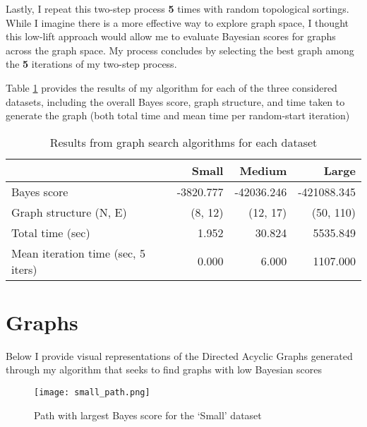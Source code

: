 \documentclass[twoside,11pt]{article}
\begin{document}
Lastly, I repeat this two-step process \textbf{5} times with random topological sortings. While I imagine there is a more effective way to explore graph space, I thought this low-lift approach would allow me to evaluate Bayesian scores for graphs across the graph space. My process concludes by selecting the best graph among the \textbf{5} iterations of my two-step process.

Table \ref{tab:results} provides the results of my algorithm for each of the three considered datasets, including the overall Bayes score, graph structure, and time taken to generate the graph (both total time and mean time per random-start iteration)

\begin{table}
    \begin{center}
    \begin{tabular}{lrrr}
         {} & \textbf{Small} & \textbf{Medium} & \textbf{Large}\\
         \midrule
        Bayes score                           & -3820.777   & -42036.246 & -421088.345  \\
        Graph structure (N, E)                &   (8, 12)   &   (12, 17) &   (50, 110)  \\
        Total time (sec)                      &     1.952   &    30.824  &    5535.849  \\
        Mean iteration time (sec, 5 iters)   &      0.000   &     6.000  &    1107.000  \\
        \bottomrule
    \end{tabular}
    \end{center}
    \caption{\label{tab:results} Results from graph search algorithms for each dataset}
\end{table}




\section{Graphs}
Below I provide visual representations of the Directed Acyclic Graphs generated through my algorithm that seeks to find graphs with low Bayesian scores

\begin{figure}[h]
    \centering
    \texttt{[image: small\_path.png]}
    \caption{Path with largest Bayes score for the `Small' dataset}
\end{figure}
\end{document}
